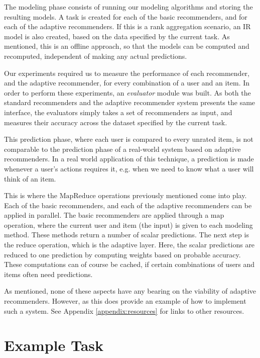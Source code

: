 The modeling phase consists of running our modeling algorithms and storing the resulting models.
A task is created for each of the basic recommenders, and for each of the adaptive recommenders.
If this is a rank aggregation scenario, an IR model is also created, based on the data
specified by the current task.
As mentioned, this is an offline approach, so that the models can be computed and recomputed,
independent of making any actual predictions.

Our experiments required us to measure the performance of each
recommender, and the adaptive recommender, for every combination of 
a user and an item.
In order to perform these experiments, an \emph{evaluator} module was built.
As both the standard recommenders and the adaptive recommender system presents the same 
interface, the evaluators simply takes a set of recommenders as input, 
and measures their accuracy across the dataset specified by the current task.

This prediction phase, where each user is compared to every unrated item,
is not comparable to the prediction phase of a real-world system
based on adaptive recommenders. In a real world application of this technique,
a prediction is made whenever a user's actions requires it,
e.g. when we need to know what a user will think of an item.

This is where the $\mathrm{MapReduce}$ operations previously mentioned come into play.
Each of the basic recommenders, and each of the adaptive recommenders can be applied in parallel.
The basic recommenders are applied through a $\mathrm{map}$ operation, where the current user and item (the input)
is given to each modeling method. These methods return a number of scalar predictions.
The next step is the $\mathrm{reduce}$ operation, which is the adaptive layer.
Here, the scalar predictions are reduced to one prediction by computing weights
based on probable accuracy.
These computations can of course be cached, if certain combinations of users and items
often need predictions.

As mentioned, none of these aspects have any bearing on the viability of adaptive recommenders.
However, as this does provide an example of how to implement such a system. 
See Appendix \ref{appendix:resources} for links to other resources. 


\section{Example Task}

